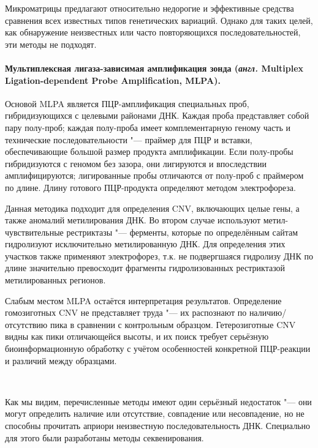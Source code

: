 \documentclass[a4paper,12pt]{article}
\begin{document}
Микроматрицы предлагают относительно недорогие и эффективные средства сравнения всех известных типов генетических вариаций.
Однако для таких целей, как обнаружение неизвестных или часто повторяющихся последовательностей, эти методы не подходят\cite{Gresham_2008}.

\paragraph{Мультиплексная лигаза-зависимая амплификация зонда (\textit{англ.} Multiplex Ligation-dependent Probe Amplification, MLPA).}
Основой MLPA является ПЦР-амплификация специальных проб, гибридизующихся с целевыми районами ДНК.
Каждая проба представляет собой пару полу-проб;
каждая полу-проба имеет комплементарную геному часть и технические последовательности "--- праймер для ПЦР и вставки, обеспечивающие большой размер продукта амплификации.
Если полу-пробы гибридизуются с геномом без зазора, они лигируются и впоследствии амплифицируются;
лигированные пробы отличаются от полу-проб с праймером по длине.
Длину готового ПЦР-продукта определяют методом электрофореза.

Данная методика подходит для определения CNV, включающих целые гены, а также аномалий метилирования ДНК.
Во втором случае используют метил-чувствительные рестриктазы "--- ферменты, которые по определённым сайтам гидролизуют исключительно метилированную ДНК.
Для определения этих участков также применяют электрофорез, т.к. не подвергшаяся гидролизу ДНК по длине значительно превосходит фрагменты гидролизованных рестриктазой метилированных регионов.

Слабым местом MLPA остаётся интерпретация результатов.
Определение гомозиготных CNV не представляет труда "--- их распознают по наличию/отсутствию пика в сравнении с контрольным образцом.
Гетерозиготные CNV видны как пики отличающейся высоты, и их поиск требует серьёзную биоинформационную обработку с учётом особенностей конкретной ПЦР-реакции и различий между образцами\cite{Stuppia_2012}.

~

Как мы видим, перечисленные методы имеют один серьёзный недостаток "--- они могут определить наличие или отсутствие, совпадение или несовпадение, но не способны прочитать априори неизвестную последовательность ДНК.
Специально для этого были разработаны методы секвенирования.
\end{document}
